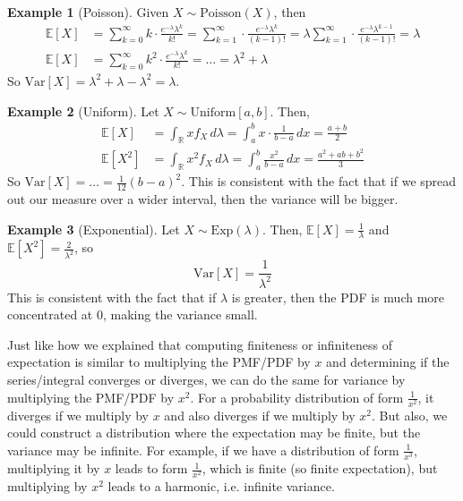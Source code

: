 \documentclass{article}
\theoremstyle{definition}
\newtheorem{example}{Example}[section]
\theoremstyle{remark}
\theoremstyle{definition}
\begin{document}
\begin{example}[Poisson]
Given $X \sim \mathrm{Poisson}(X)$, then 
\begin{align*}
    \mathbb{E}[X] & = \sum_{k = 0}^\infty k \cdot \frac{e^{-\lambda} \lambda^k}{k!} = \sum_{k = 1}^\infty \cdot \frac{e^{-\lambda} \lambda^k}{(k-1)!} = \lambda \sum_{k = 1}^\infty \cdot \frac{e^{-\lambda} \lambda^{k-1}}{(k-1)!} = \lambda\\
    \mathbb{E}[X] & = \sum_{k=0}^\infty k^2 \cdot \frac{e^{-\lambda} \lambda^k}{k!} = \ldots = \lambda^2 + \lambda
\end{align*}
So $\mathrm{Var}[X] = \lambda^2 + \lambda - \lambda^2 = \lambda$. 
\end{example}

\begin{example}[Uniform]
Let $X \sim \mathrm{Uniform}[a, b]$. Then, 
\begin{align*}
    \mathbb{E}[X] & = \int_\mathbb{R} x f_X \, d\lambda = \int_a^b x \cdot \frac{1}{b - a}\,dx = \frac{a + b}{2} \\
    \mathbb{E}[X^2] & = \int_\mathbb{R} x^2 f_X \,d\lambda = \int_a^b \frac{x^2}{b - a} \,dx = \frac{a^2 + ab + b^2}{3} 
\end{align*}
So $\mathrm{Var}[X] = \ldots = \frac{1}{12} (b - a)^2$. This is consistent with the fact that if we spread out our measure over a wider interval, then the variance will be bigger. 
\end{example}

\begin{example}[Exponential]
Let $X \sim \mathrm{Exp}(\lambda)$. Then, $\mathbb{E}[X] = \frac{1}{\lambda}$ and $\mathbb{E}[X^2] = \frac{2}{\lambda^2}$, so 
\[\mathrm{Var}[X] = \frac{1}{\lambda^2}\]
This is consistent with the fact that if $\lambda$ is greater, then the PDF is much more concentrated at $0$, making the variance small. 
\end{example}

Just like how we explained that computing finiteness or infiniteness of expectation is similar to multiplying the PMF/PDF by $x$ and determining if the series/integral converges or diverges, we can do the same for variance by multiplying the PMF/PDF by $x^2$. For a probability distribution of form $\frac{1}{x^2}$, it diverges if we multiply by $x$ and also diverges if we multiply by $x^2$. But also, we could construct a distribution where the expectation may be finite, but the variance may be infinite. For example, if we have a distribution of form $\frac{1}{x^3}$, multiplying it by $x$ leads to form $\frac{1}{x^2}$, which is finite (so finite expectation), but multiplying by $x^2$ leads to a harmonic, i.e. infinite variance. 
\end{document}
